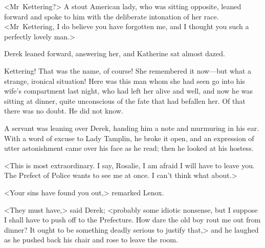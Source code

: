 <Mr~Kettering?> A stout American lady, who was sitting opposite, leaned forward and spoke to him with the deliberate intonation of her race. <Mr~Kettering, I do believe you have forgotten me, and I thought you such a perfectly lovely man.>

Derek leaned forward, answering her, and Katherine sat almost dazed.

Kettering! That was the name, of course! She remembered it now—but what a strange, ironical situation! Here was this man whom she had seen go into his wife's compartment last night, who had left her alive and well, and now he was sitting at dinner, quite unconscious of the fate that had befallen her. Of that there was no doubt. He did not know.

A servant was leaning over Derek, handing him a note and murmuring in his ear. With a word of excuse to Lady Tamplin, he broke it open, and an expression of utter astonishment came over his face as he read; then he looked at his hostess.

<This is most extraordinary. I say, Rosalie, I am afraid I will have to leave you. The Prefect of Police wants to see me at once. I can't think what about.>

<Your sins have found you out,> remarked Lenox.

<They must have,> said Derek; <probably some idiotic nonsense, but I suppose I shall have to push off to the Prefecture. How dare the old boy rout me out from dinner? It ought to be something deadly serious to justify that,> and he laughed as he pushed back his chair and rose to leave the room.